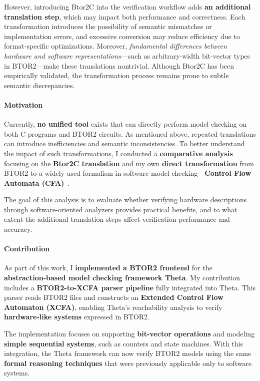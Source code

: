 However, introducing Btor2C into the verification workflow adds \textbf{an additional translation step}, which may impact both performance and correctness. Each transformation introduces the possibility of semantic mismatches or implementation errors, and excessive conversion may reduce efficiency due to format-specific optimizations. Moreover, \textit{fundamental differences between hardware and software representations}---such as arbitrary-width bit-vector types in BTOR2---make these translations nontrivial. Although Btor2C has been empirically validated, the transformation process remains prone to subtle semantic discrepancies.

\paragraph{Motivation} Currently, \textbf{no unified tool} exists that can directly perform model checking on both C programs and BTOR2 circuits. As mentioned above, repeated translations can introduce inefficiencies and semantic inconsistencies. To better understand the impact of such transformations, I conducted a \textbf{comparative analysis} focusing on the \textbf{Btor2C translation} and my own \textbf{direct transformation} from BTOR2 to a widely used formalism in software model checking---\textbf{Control Flow Automata (CFA)}~\cite{cfa}. 

The goal of this analysis is to evaluate whether verifying hardware descriptions through software-oriented analyzers provides practical benefits, and to what extent the additional translation steps affect verification performance and accuracy.

\paragraph{Contribution} As part of this work, I \textbf{implemented a BTOR2 frontend} for the \textbf{abstraction-based model checking framework Theta}. My contribution includes a \textbf{BTOR2-to-XCFA parser pipeline} fully integrated into Theta. This parser reads BTOR2 files and constructs an \textbf{Extended Control Flow Automaton (XCFA)}, enabling Theta’s reachability analysis to verify \textbf{hardware-like systems} expressed in BTOR2.

The implementation focuses on supporting \textbf{bit-vector operations} and modeling \textbf{simple sequential systems}, such as counters and state machines. With this integration, the Theta framework can now verify BTOR2 models using the same \textbf{formal reasoning techniques} that were previously applicable only to software systems.